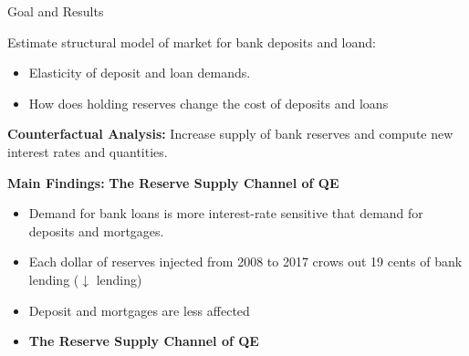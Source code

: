 \documentclass[notes,11pt, aspectratio=169]{beamer}
\newenvironment{wideitemize}{\itemize\addtolength{\itemsep}{10pt}}{\enditemize}
\begin{document}
\begin{frame}{Goal and Results}

    \vspace{0.5cm}
      \begin{wideitemize}

      \item Estimate structural model of market for bank deposits and loand:
      \begin{itemize}
        \item Elasticity of deposit and loan demands.
        \item How does holding reserves change the cost of deposits and loans
      \end{itemize}
      \item \textbf{Counterfactual Analysis:} Increase supply of bank reserves and compute new interest rates and quantities. 

\pause

      \item \textbf{Main Findings:} \textbf{The Reserve Supply Channel of QE}
      \begin{itemize}
        \item Demand for bank loans is more interest-rate sensitive that demand for deposits and mortgages. 
        \item Each dollar of reserves injected from 2008 to 2017 crows out 19 cents of bank lending ($\downarrow$ lending)
        \item Deposit and mortgages are less affected 
        \item \textbf{The Reserve Supply Channel of QE}
      \end{itemize}

    \end{wideitemize}
      \end{frame}
    
\end{document}
